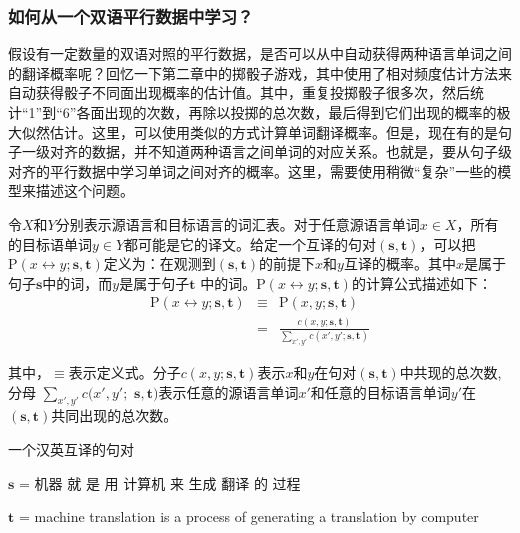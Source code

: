 \subsubsection{如何从一个双语平行数据中学习？}

\parinterval 假设有一定数量的双语对照的平行数据，是否可以从中自动获得两种语言单词之间的翻译概率呢？回忆一下第二章中的掷骰子游戏，其中使用了相对频度估计方法来自动获得骰子不同面出现概率的估计值。其中，重复投掷骰子很多次，然后统计``1''到``6''各面出现的次数，再除以投掷的总次数，最后得到它们出现的概率的极大似然估计。这里，可以使用类似的方式计算单词翻译概率。但是，现在有的是句子一级对齐的数据，并不知道两种语言之间单词的对应关系。也就是，要从句子级对齐的平行数据中学习单词之间对齐的概率。这里，需要使用稍微``复杂''一些的模型来描述这个问题。

令$X$和$Y$分别表示源语言和目标语言的词汇表。对于任意源语言单词$x \in X$，所有的目标语单词$y \in Y$都可能是它的译文。给定一个互译的句对$(\mathbf{s},\mathbf{t})$，可以把$\textrm{P}(x \leftrightarrow y; \mathbf{s}, \mathbf{t})$定义为：在观测到$(\mathbf{s},\mathbf{t})$的前提下$x$和$y$互译的概率。其中$x$是属于句子$\mathbf{s}$中的词，而$y$是属于句子$\mathbf{t}$ 中的词。$\textrm{P}(x \leftrightarrow y; \mathbf{s},\mathbf{t})$的计算公式描述如下：
\vspace{-0.5em}
\begin{eqnarray}
\textrm{P}(x \leftrightarrow y; \mathbf{s},\mathbf{t}) & \equiv & \textrm{P}(x,y;\mathbf{s},\mathbf{t})   \nonumber \\
                                                                             & =        & \frac{c(x,y;\mathbf{s},\mathbf{t})}{\sum_{x',y'} c(x',y';\mathbf{s},\mathbf{t})}
\label{eq:3-1}
\end{eqnarray}

\noindent 其中，$\equiv$表示定义式。分子$c(x,y;\mathbf{s},\mathbf{t})$表示$x$和$y$在句对$(\mathbf{s},\mathbf{t})$中共现的总次数,分母 $\sum_{x',y'} c(x',y';$ $\mathbf{s},\mathbf{t})$表示任意的源语言单词$x'$和任意的目标语言单词$y'$在$(\mathbf{s},\mathbf{t})$共同出现的总次数。

\begin{example}
一个汉英互译的句对

$\mathbf{s}$ = 机器\; 就\; 是\; 用\; 计算机\; 来\; 生成\; {\color{red}翻译}\; 的\; 过程

$\mathbf{t}$ = machine\; {\color{red}translation}\; is\; a\; process\; of\; generating\; a\;  {\color{red}translation}\; by\; computer
\label{eg:3-1}
\end{example}

